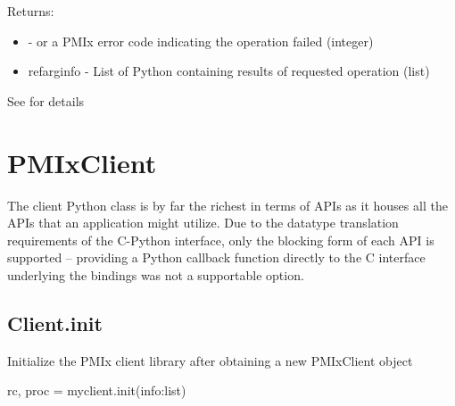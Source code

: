 \begin{arglist}
\end{arglist}

Returns:
\begin{itemize}
    \item {} -  or a \ac{PMIx} error code indicating the operation failed (integer)
    \item refarg{info} - List of Python  containing results of requested operation (list)
\end{itemize}

See  for details



\section{PMIxClient}
\label{app:python:client}

The client Python class is by far the richest in terms of \acp{API} as it houses all the \acp{API} that an application might utilize. Due to the datatype translation requirements of the C-Python interface, only the blocking form of each \ac{API} is supported – providing a Python callback function directly to the C interface underlying the bindings was not a supportable option.

\subsection{Client.init}

\summary Initialize the \ac{PMIx} client library after obtaining a new PMIxClient object

\format

\pyspecificstart
\begin{codepar}
rc, proc = myclient.init(info:list)
\end{codepar}
\pyspecificend


\begin{arglist}
\end{arglist}

